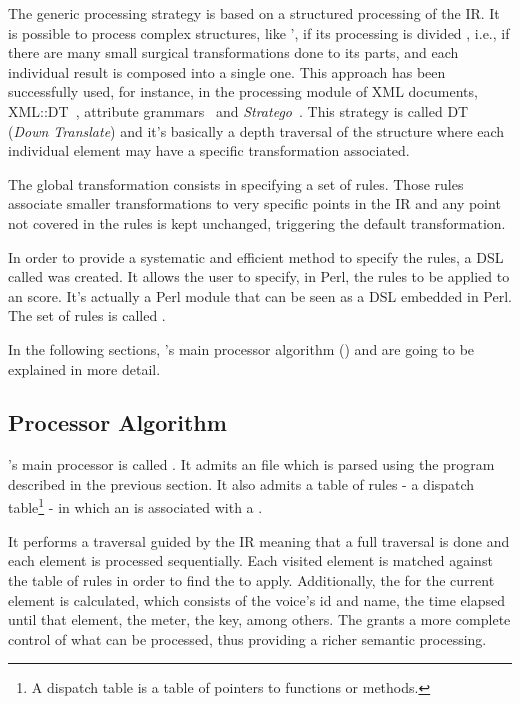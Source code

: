 The generic processing strategy is based on a structured processing of the \ac{IR}. It is possible
to process complex structures, like \abcmtops{}', if its processing is divided , i.e., if there are
many small surgical transformations done to its parts, and each individual result is composed into a
single one.  This approach has been successfully used, for instance, in the processing module of XML
documents, XML::DT~\cite{tesejj}, attribute grammars~\cite{paakki1995attribute} and
\emph{Stratego}~\cite{Stratego:Online}.  This strategy is called DT (\emph{Down Translate}) and it's
basically a depth traversal of the structure where each individual element may have a specific
transformation associated.

The global transformation consists in specifying a set of rules. Those rules associate smaller
transformations to very specific points in the \ac{IR} and any point not covered in the rules is
kept unchanged, triggering the default transformation.

In order to provide a systematic and efficient method to specify the rules, a \ac{DSL} called
\abcdt{} was created. It allows the user to specify, in Perl, the rules to be applied to an \abc{}
score. It's actually a Perl module that can be seen as a \ac{DSL} embedded in Perl. The set of rules
is called \abcdtrules{}.

In the following sections, \abcdt{}'s main processor algorithm (\dt{}) and \abcdtrules{} are going
to be explained in more detail.

\subsection{Processor Algorithm}

\abcdt{}'s main processor is called \dt{}. It admits an \abc{} file which is parsed using the
\abctoperl{} program described in the previous section. It also admits a table of \abcdt{} rules - a
dispatch table\footnote{A dispatch table is a table of pointers to functions or methods.} - in which
an \actuator{} is associated with a \transformation{}.

It performs a traversal guided by the \ac{IR} meaning that a full traversal is done and each \abc{}
element is processed sequentially. Each visited element is matched against the table of \abcdt{}
rules in order to find the \transformation{} to apply. Additionally, the \context{} for the current
element is calculated, which consists of the voice's id and name, the time elapsed until that
element, the meter, the key, among others. The \context{} grants a more complete control of what can
be processed, thus providing a richer semantic processing.

